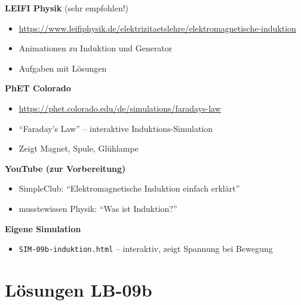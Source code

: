 \documentclass[a4paper,11pt]{article}
\begin{document}
\begin{warnbox}
\textbf{LEIFI Physik} (sehr empfohlen!)
\begin{itemize}[noitemsep]
    \item \url{https://www.leifiphysik.de/elektrizitaetslehre/elektromagnetische-induktion}
    \item Animationen zu Induktion und Generator
    \item Aufgaben mit Lösungen
\end{itemize}

\textbf{PhET Colorado}
\begin{itemize}[noitemsep]
    \item \url{https://phet.colorado.edu/de/simulations/faradays-law}
    \item ``Faraday's Law'' -- interaktive Induktions-Simulation
    \item Zeigt Magnet, Spule, Glühlampe
\end{itemize}

\textbf{YouTube (zur Vorbereitung)}
\begin{itemize}[noitemsep]
    \item SimpleClub: ``Elektromagnetische Induktion einfach erklärt''
    \item musstewissen Physik: ``Was ist Induktion?''
\end{itemize}

\textbf{Eigene Simulation}
\begin{itemize}[noitemsep]
    \item \texttt{SIM-09b-induktion.html} -- interaktiv, zeigt Spannung bei Bewegung
\end{itemize}
\end{warnbox}

\vspace{5mm}

\section*{Lösungen LB-09b}
\end{document}
